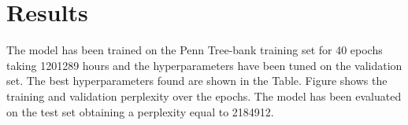 \section{Results}
The model has been trained on the Penn Tree-bank training set for 40 epochs taking 1201289 hours and the hyperparameters have been tuned on the validation set. The best hyperparameters found are shown in the Table.
Figure shows the training and validation perplexity over the epochs. The model has been evaluated on the test set obtaining a perplexity equal to 2184912.

